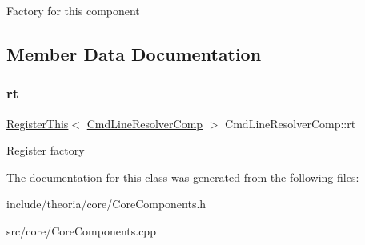 Factory for this component 

\subsection{Member Data Documentation}
\mbox{\label{classtheoria_1_1core_1_1CmdLineResolverComp_abcfcffaadb0282780e36034efc28f3aa}} 
\subsubsection{\texorpdfstring{rt}{rt}}
{\footnotesize\ttfamily \hyperlink{classtheoria_1_1core_1_1RegisterThis}{Register\+This}$<$ \hyperlink{classtheoria_1_1core_1_1CmdLineResolverComp}{Cmd\+Line\+Resolver\+Comp} $>$ Cmd\+Line\+Resolver\+Comp\+::rt\hspace{0.3cm}{\ttfamily [static]}}

Register factory 

The documentation for this class was generated from the following files\+:\begin{DoxyCompactItemize}
\item 
include/theoria/core/Core\+Components.\+h\item 
src/core/Core\+Components.\+cpp\end{DoxyCompactItemize}
